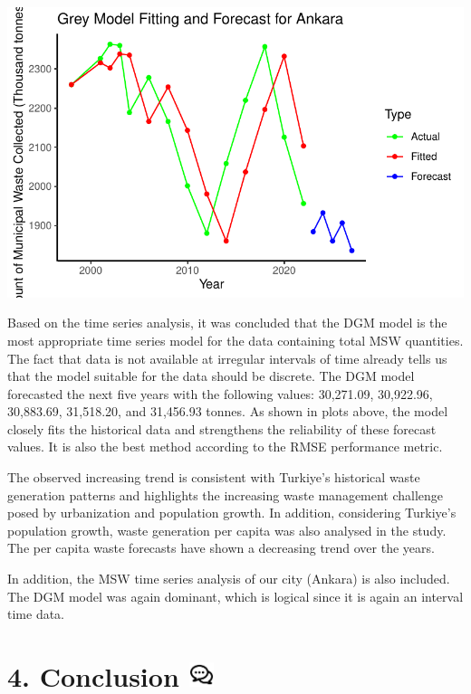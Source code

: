 \documentclass[
  11pt,
  a4paper,
  DIV=11,
  numbers=noendperiod]{scrartcl}
\begin{document}
\includegraphics{project_files/figure-pdf/unnamed-chunk-53-1.pdf}

Based on the time series analysis, it was concluded that the DGM model
is the most appropriate time series model for the data containing total
MSW quantities. The fact that data is not available at irregular
intervals of time already tells us that the model suitable for the data
should be discrete. The DGM model forecasted the next five years with
the following values: 30,271.09, 30,922.96, 30,883.69, 31,518.20, and
31,456.93 tonnes. As shown in plots above, the model closely fits the
historical data and strengthens the reliability of these forecast
values. It is also the best method according to the RMSE performance
metric.

The observed increasing trend is consistent with Turkiye's historical
waste generation patterns and highlights the increasing waste management
challenge posed by urbanization and population growth. In addition,
considering Turkiye's population growth, waste generation per capita was
also analysed in the study. The per capita waste forecasts have shown a
decreasing trend over the years.

In addition, the MSW time series analysis of our city (Ankara) is also
included. The DGM model was again dominant, which is logical since it is
again an interval time data.

\section[{4. Conclusion} ]{\texorpdfstring{{4. Conclusion}
\protect\includegraphics[width=0.28125in,height=\textheight]{assets/images/discussion.png}}{4. Conclusion }}\label{conclusion}
\end{document}
